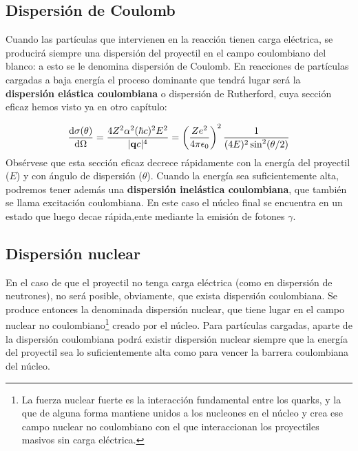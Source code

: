 
\subsection{Dispersión de Coulomb}

Cuando las partículas que intervienen en la reacción tienen carga eléctrica, se producirá siempre una dispersión del proyectil en el campo coulombiano del blanco: a esto se le denomina dispersión de Coulomb. En reacciones de partículas cargadas a baja energía el proceso dominante que tendrá lugar será la \textbf{dispersión elástica coulombiana} o dispersión de Rutherford, cuya sección eficaz hemos visto ya en otro capítulo:

\begin{equation}
    \frac{\mathrm{d} \sigma(\theta)}{\mathrm{d} \Omega} = \frac{4 Z^2 \alpha^2 (\hbar c)^2 E^2}{|\mathbf{q} c|^4} = \left( \frac{Ze^2}{4 \pi \epsilon_0} \right)^2 \frac{1}{(4E)^2 \sin^2(\theta/2)}
\end{equation}
Obsérvese que esta sección eficaz decrece rápidamente con la energía del proyectil ($E$) y con ángulo de dispersión ($\theta$). Cuando la energía sea suficientemente alta, podremos tener además una \textbf{dispersión inelástica coulombiana}, que también se llama excitación coulombiana. En este caso el núcleo final se encuentra en un estado que luego decae rápida,ente mediante la emisión de fotones $\gamma$. 

\subsection{Dispersión nuclear}

En el caso de que el proyectil no tenga carga eléctrica (como en dispersión de neutrones), no será posible, obviamente, que exista dispersión coulombiana. Se produce entonces la denominada dispersión nuclear, que tiene lugar en el campo nuclear no coulombiano\footnote{La fuerza nuclear fuerte es la interacción fundamental entre los quarks, y la que de alguna forma mantiene unidos a los nucleones en el núcleo y crea ese campo nuclear no coulombiano con el que interaccionan los proyectiles masivos sin carga eléctrica.} creado por el núcleo. Para partículas cargadas, aparte de la dispersión coulombiana podrá existir dispersión nuclear siempre que la energía del proyectil sea lo suficientemente alta como para vencer la barrera coulombiana del núcleo. 


